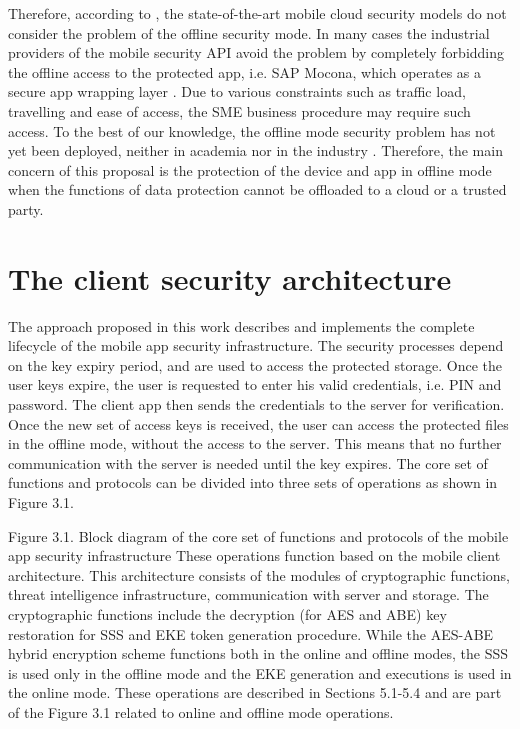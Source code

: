 \documentclass[twocolumn]{svjour3}          %
\begin{document}
Therefore, according to \cite{khan2015cloud, tenorio2013greatest, khan2013towards}, the state-of-the-art mobile cloud security models do not consider the problem of the offline security mode. In many cases the industrial providers of the mobile security API avoid the problem by completely forbidding the offline access to the protected app, i.e. SAP Mocona, which operates as a secure app wrapping layer \cite{Lelyveld2013}. Due to various constraints such as traffic load, travelling and ease of access, the SME business procedure may require such access. To the best of our knowledge, the offline mode security problem has not yet been deployed, neither in academia nor in the industry \cite{yovel2014, khan2015cloud, khan2014survey, khan2013towards}. Therefore, the main concern of this proposal is the protection of the device and app in offline mode when the functions of data protection cannot be offloaded to a cloud or a trusted party. 

\section{The client security architecture}
\label{sec_the_client_security_architecture}
The approach proposed in this work describes and implements the complete lifecycle of the mobile app security infrastructure. The security processes depend on the key expiry period, and are used to access the protected storage. Once the user keys expire, the user is requested to enter his valid credentials, i.e. PIN and password. The client app then sends the credentials to the server for verification. Once the new set of access keys is received, the user can access the protected files in the offline mode, without the access to the server. This means that no further communication with the server is needed until the key expires. The core set of functions and protocols can be divided into three sets of operations as shown in Figure 3.1.

Figure 3.1. Block diagram of the core set of functions and protocols of the mobile app security infrastructure
These operations function based on the mobile client architecture. This architecture consists of the modules of cryptographic functions, threat intelligence infrastructure, communication with server and storage. 
The cryptographic functions include the decryption (for AES and ABE) key restoration for SSS and EKE token generation procedure. While the AES-ABE hybrid encryption scheme functions both in the online and offline modes, the SSS is used only in the offline mode and the EKE generation and executions is used in the online mode. These operations are described in Sections 5.1-5.4 and are part of the Figure 3.1 related to online and offline mode operations.
\end{document}
